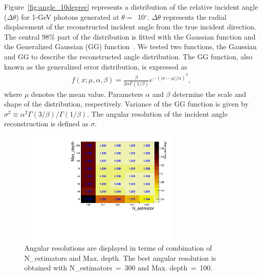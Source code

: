\documentclass[preprint,12pt,times,a4paper]{elsarticle}
\begin{document}
Figure~\ref{fig:angle_10degree} represents a distribution of the relative incident angle ($\Delta\theta$) for 1-GeV photons generated at $\theta=$~10$^{\circ}$. $\Delta\theta$ represents the radial displacement of the reconstructed incident angle from the true incident direction. The central 98\% part of the distribution is fitted with the Gaussian function and the Generalized Gaussian (GG) function~\cite{GGfun}. We tested two functions, the Gaussian and GG to describe the reconstructed angle distribution. The GG function, also known as the generalized error distribution, is expressed as
\begin{eqnarray} 
f(x; \mu, \alpha, \beta) = \frac{\beta}{2 \alpha \Gamma(1/\beta)}e^{-(|x-\mu|/\alpha)^\beta},
\label{eqn:gg}
\end{eqnarray}
where $\mu$ denotes the mean value. Parameters $\alpha$ and $\beta$ determine the scale and shape of the distribution, respectively. Variance of the GG function is given by $\sigma^2 \equiv \alpha^2 \Gamma(3/\beta) / \Gamma(1/\beta)$. The angular resolution of the incident angle reconstruction is defined as $\sigma$.

\begin{figure}[!hbt]
\centering
\includegraphics[width=0.69\textwidth]{figures/Fig4_Opt.pdf}
\caption{Angular resolutions are displayed in terms of combination of N\_estimators and Max. depth. The best angular resolution is obtained with N\_estimators~=~300 and Max. depth~=~100. }
\label{fig:par_scan}
\end{figure}
\end{document}
